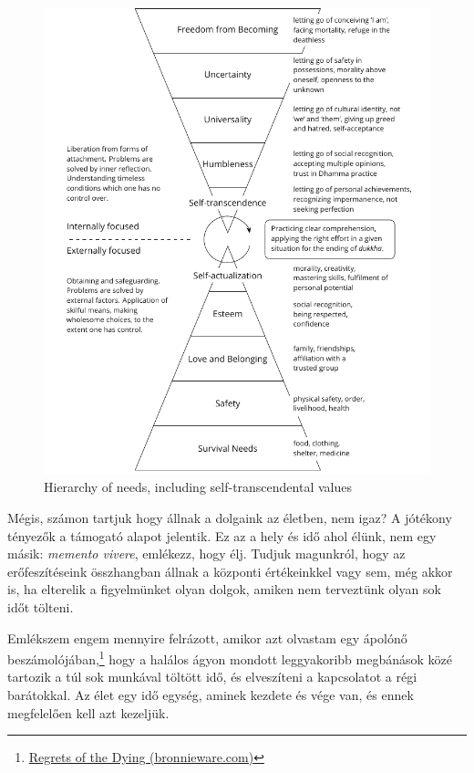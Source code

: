 \clearpage
\figurepagelayout

\begin{figure}[h]
\caption{Hierarchy of needs, including self-transcendental values}\label{fig-self-transcendental}
\bigskip
\includegraphics[width=\linewidth]{./manuscript/tex/diagrams/self-transcendental-values.pdf}
\end{figure}


\clearpage
\normalpagelayout

Mégis, számon tartjuk hogy állnak a dolgaink az életben, nem igaz? A
jótékony tényezők a támogató alapot jelentik. Ez az a hely és idő ahol
élünk, nem egy másik: \emph{memento vivere}, emlékezz, hogy élj. Tudjuk
magunkról, hogy az erőfeszítéseink összhangban állnak a központi
értékeinkkel vagy sem, még akkor is, ha elterelik a figyelmünket olyan
dolgok, amiken nem terveztünk olyan sok időt tölteni.

Emlékszem engem mennyire felrázott, amikor azt olvastam egy ápolónő
beszámolójában,\footnote{\href{https://bronnieware.com/blog/regrets-of-the-dying/}{Regrets
  of the Dying (bronnieware.com)}} hogy a halálos ágyon mondott
leggyakoribb megbánások közé tartozik a túl sok munkával töltött idő, és
elveszíteni a kapcsolatot a régi barátokkal. Az élet egy idő egység,
aminek kezdete és vége van, és ennek megfelelően kell azt kezeljük.

